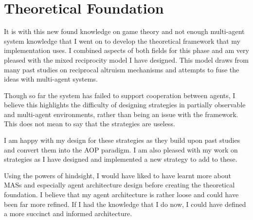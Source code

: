 \documentclass[]{final_report}
\begin{document}
\section{Theoretical Foundation}
It is with this new found knowledge on game theory and not enough multi-agent system knowledge that I went on to develop the theoretical framework that my implementation uses. I combined aspects of both fields for this phase and am very pleased with the mixed reciprocity model I have designed. This model draws from many past studies on reciprocal altruism mechanisms and attempts to fuse the ideas with multi-agent systems.\par 
Though so far the system has failed to support cooperation between agents, I believe this highlights the difficulty of designing strategies in partially observable and multi-agent environments, rather than being an issue with the framework. This does not mean to say that the strategies are useless.\par 
I am happy with my design for these strategies as they build upon past studies and convert them into the AOP paradigm. I am also pleased with my work on strategies as I have designed and implemented a new strategy to add to these.\par 
Using the powers of hindsight, I would have liked to have learnt more about MASs and especially agent architecture design before creating the theoretical foundation. I believe that my agent architecture is rather loose and could have been far more refined. If I had the knowledge that I do now, I could have defined a more succinct and informed architecture.
\end{document}
